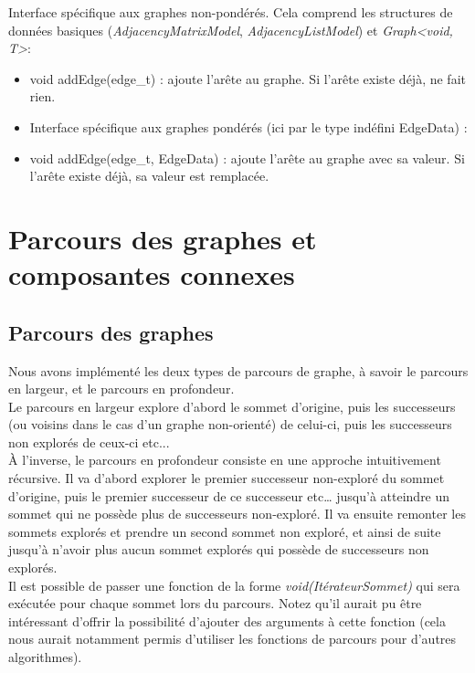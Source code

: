 \documentclass[12pt]{article}
\begin{document}
Interface spécifique aux graphes non-pondérés. Cela comprend les structures de données basiques ({\it AdjacencyMatrixModel}, {\it AdjacencyListModel}) et {\it Graph<void, T>}: \\ \begin{itemize}
\item void addEdge(edge\_t) : ajoute l'arête au graphe. Si l'arête existe déjà, ne fait rien.
\item Interface spécifique aux graphes pondérés (ici par le type indéfini EdgeData) :
\item void addEdge(edge\_t, EdgeData) : ajoute l'arête au graphe avec sa valeur. Si l'arête existe déjà, sa valeur est remplacée. 
\end{itemize}

\clearpage

\section{Parcours des graphes et composantes connexes}
\subsection{Parcours des graphes}
Nous avons implémenté les deux types de parcours de graphe, à savoir le parcours en largeur, et le parcours en profondeur. \\
Le parcours en largeur explore d'abord le sommet d'origine, puis les successeurs (ou voisins dans le cas d'un graphe non-orienté) de celui-ci, puis les successeurs non explorés de ceux-ci etc... \\
 À l'inverse, le parcours en profondeur consiste en une approche intuitivement récursive. Il va d'abord explorer le premier successeur non-exploré du sommet d'origine, puis le premier successeur de ce successeur etc… jusqu'à atteindre un sommet qui ne possède plus de successeurs non-exploré. Il va ensuite remonter les sommets explorés et prendre un second sommet non exploré, et ainsi de suite jusqu'à n'avoir plus aucun sommet explorés qui possède de successeurs non explorés.\\
Il est possible de passer une fonction de la forme {\it void(ItérateurSommet)} qui sera exécutée pour chaque sommet lors du parcours. Notez qu'il aurait pu être intéressant d'offrir la possibilité d'ajouter des arguments à cette fonction (cela nous aurait notamment permis d'utiliser les fonctions de parcours pour d'autres algorithmes).\\
\end{document}
